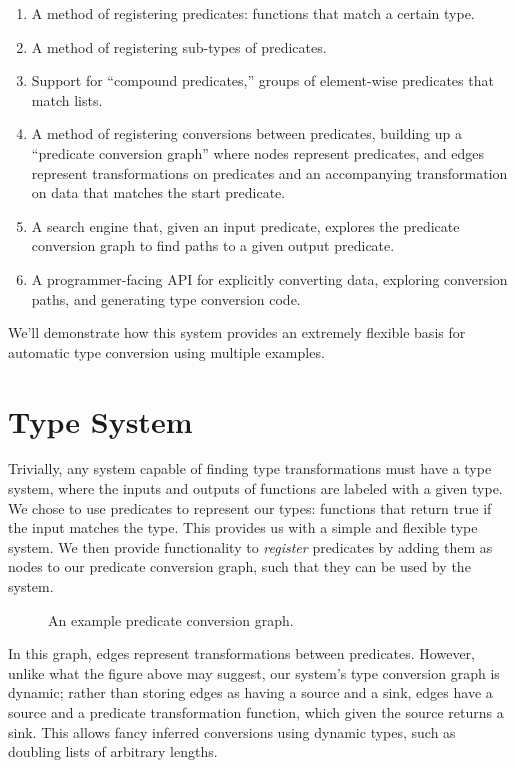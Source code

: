 \documentclass[letterpaper]{article}
\begin{document}
\begin{enumerate}
  \item A method of registering predicates: functions that match a certain type.
  \item A method of registering sub-types of predicates.
  \item Support for ``compound predicates,'' groups of element-wise predicates that match lists.
  \item A method of registering conversions between predicates, building up a ``predicate conversion graph'' where nodes represent predicates, and edges represent transformations on predicates and an accompanying transformation on data that matches the start predicate.
  \item A search engine that, given an input predicate, explores the predicate conversion graph to find paths to a given output predicate.
  \item A programmer-facing API for explicitly converting data, exploring conversion paths, and generating type conversion code.
\end{enumerate}

We'll demonstrate how this system provides an extremely flexible basis for automatic type conversion using multiple examples.

\section{Type System}

Trivially, any system capable of finding type transformations must have a type system, where the inputs and outputs of functions are labeled with a given type.  We chose to use predicates to represent our types: functions that return true if the input matches the type.  This provides us with a simple and flexible type system.  We then provide functionality to \textit{register} predicates by adding them as nodes to our predicate conversion graph, such that they can be used by the system.

\begin{figure}[h!]
\centering

\caption{An example predicate conversion graph.}
\label{graph}
\end{figure}

In this graph, edges represent transformations between predicates.  However, unlike what the figure above may suggest, our system's type conversion graph is dynamic; rather than storing edges as having a source and a sink, edges have a source and a predicate transformation function, which given the source returns a sink.  This allows fancy inferred conversions using dynamic types, such as doubling lists of arbitrary lengths.
\end{document}
